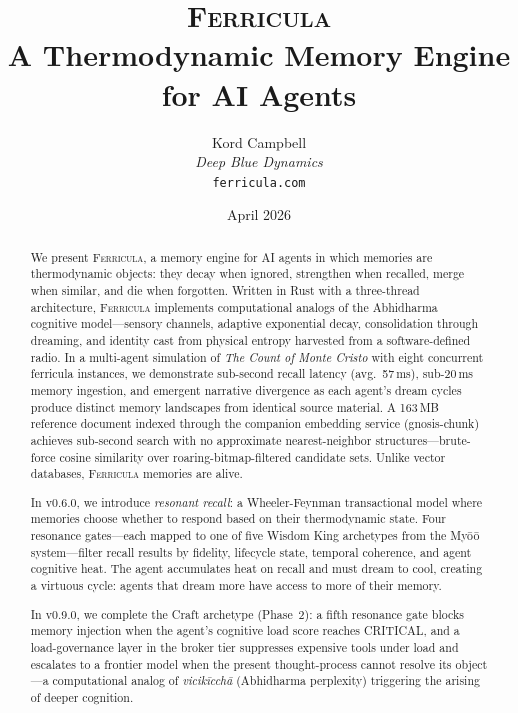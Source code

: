\documentclass[twocolumn,10pt]{article}
\title{%
\textsc{Ferricula}\\[4pt]
\large A Thermodynamic Memory Engine for AI Agents%
}
\author{%
Kord Campbell\\
\textit{Deep Blue Dynamics}\\
\texttt{ferricula.com}%
}
\date{April 2026}
\begin{document}
\maketitle

\begin{abstract}
\noindent
We present \textsc{Ferricula}, a memory engine for AI agents in
which memories are thermodynamic objects: they decay when ignored,
strengthen when recalled, merge when similar, and die when forgotten.
Written in Rust with a three-thread architecture, \textsc{Ferricula}
implements computational analogs of the Abhidharma cognitive model---sensory
channels, adaptive exponential decay, consolidation through dreaming, and
identity cast from physical entropy harvested from a software-defined radio.
In a multi-agent simulation of \textit{The Count of Monte Cristo} with eight
concurrent ferricula instances, we demonstrate sub-second recall latency
(avg.\ 57\,ms), sub-20\,ms memory ingestion, and emergent narrative
divergence as each agent's dream cycles produce distinct memory landscapes
from identical source material.  A 163\,MB reference document indexed
through the companion embedding service (gnosis-chunk) achieves sub-second
search with no approximate nearest-neighbor structures---brute-force
cosine similarity over roaring-bitmap-filtered candidate sets.
Unlike vector databases, \textsc{Ferricula} memories are alive.

In v0.6.0, we introduce \textit{resonant recall}: a Wheeler-Feynman
transactional model where memories choose whether to respond based on
their thermodynamic state.  Four resonance gates---each mapped to one of
five Wisdom King archetypes from the My\=o\=o system---filter recall results
by fidelity, lifecycle state, temporal coherence, and agent cognitive
heat.  The agent accumulates heat on recall and must dream to cool,
creating a virtuous cycle: agents that dream more have access to more of
their memory.

In v0.9.0, we complete the Craft archetype (Phase~2): a fifth resonance
gate blocks memory injection when the agent's cognitive load score reaches
CRITICAL, and a load-governance layer in the broker tier suppresses
expensive tools under load and escalates to a frontier model when the
present thought-process cannot resolve its object---a computational analog
of \textit{vicik\=icch\=a} (Abhidharma perplexity) triggering the
arising of deeper cognition.
\end{abstract}
\end{document}

